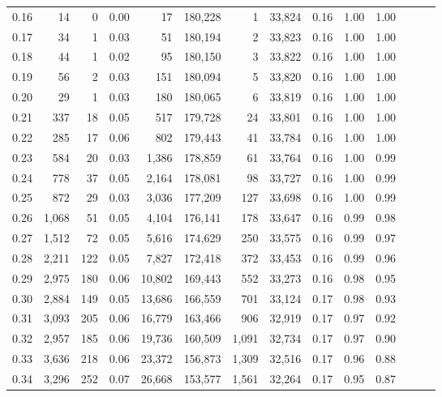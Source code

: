 \begin{tabular}{rrrrrrrrrrrrrr}
0.16 &     14 &      0 &  0.00 &       17 &  180,228 &       1 &  33,824 &  0.16 &  1.00 &      1.00 \\
0.17 &     34 &      1 &  0.03 &       51 &  180,194 &       2 &  33,823 &  0.16 &  1.00 &      1.00 \\
0.18 &     44 &      1 &  0.02 &       95 &  180,150 &       3 &  33,822 &  0.16 &  1.00 &      1.00 \\
0.19 &     56 &      2 &  0.03 &      151 &  180,094 &       5 &  33,820 &  0.16 &  1.00 &      1.00 \\
0.20 &     29 &      1 &  0.03 &      180 &  180,065 &       6 &  33,819 &  0.16 &  1.00 &      1.00 \\
0.21 &    337 &     18 &  0.05 &      517 &  179,728 &      24 &  33,801 &  0.16 &  1.00 &      1.00 \\
0.22 &    285 &     17 &  0.06 &      802 &  179,443 &      41 &  33,784 &  0.16 &  1.00 &      1.00 \\
0.23 &    584 &     20 &  0.03 &    1,386 &  178,859 &      61 &  33,764 &  0.16 &  1.00 &      0.99 \\
0.24 &    778 &     37 &  0.05 &    2,164 &  178,081 &      98 &  33,727 &  0.16 &  1.00 &      0.99 \\
0.25 &    872 &     29 &  0.03 &    3,036 &  177,209 &     127 &  33,698 &  0.16 &  1.00 &      0.99 \\
0.26 &  1,068 &     51 &  0.05 &    4,104 &  176,141 &     178 &  33,647 &  0.16 &  0.99 &      0.98 \\
0.27 &  1,512 &     72 &  0.05 &    5,616 &  174,629 &     250 &  33,575 &  0.16 &  0.99 &      0.97 \\
0.28 &  2,211 &    122 &  0.05 &    7,827 &  172,418 &     372 &  33,453 &  0.16 &  0.99 &      0.96 \\
0.29 &  2,975 &    180 &  0.06 &   10,802 &  169,443 &     552 &  33,273 &  0.16 &  0.98 &      0.95 \\
0.30 &  2,884 &    149 &  0.05 &   13,686 &  166,559 &     701 &  33,124 &  0.17 &  0.98 &      0.93 \\
0.31 &  3,093 &    205 &  0.06 &   16,779 &  163,466 &     906 &  32,919 &  0.17 &  0.97 &      0.92 \\
0.32 &  2,957 &    185 &  0.06 &   19,736 &  160,509 &   1,091 &  32,734 &  0.17 &  0.97 &      0.90 \\
0.33 &  3,636 &    218 &  0.06 &   23,372 &  156,873 &   1,309 &  32,516 &  0.17 &  0.96 &      0.88 \\
0.34 &  3,296 &    252 &  0.07 &   26,668 &  153,577 &   1,561 &  32,264 &  0.17 &  0.95 &      0.87 \\

\end{tabular}
